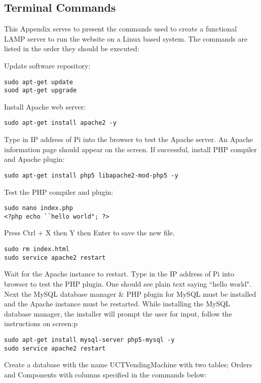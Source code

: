 \documentclass[a4paper,11pt]{article}
\numberwithin{figure}{section}
\numberwithin{table}{section}
\begin{document}
\begin{appendices}
\newpage


\section{Terminal Commands}\thispagestyle{sectionstart}
\label{sec:PiCommands}

This Appendix serves to present the commands used to create a functional LAMP server to run the website on a Linux based system. The commands are listed in the order they should be executed:

Update software repository:
\begin{lstlisting}
sudo apt-get update
suod apt-get upgrade
\end{lstlisting}
Install Apache web server:
\begin{lstlisting}[firstnumber=3]
sudo apt-get install apache2 -y
\end{lstlisting}
Type in IP address of Pi into the browser to test the Apache server. An Apache information page should appear on the screen. If successful, install PHP compiler and Apache plugin:
\begin{lstlisting}[firstnumber=4]
sudo apt-get install php5 libapache2-mod-php5 -y
\end{lstlisting}
Test the PHP compiler and plugin:
\begin{lstlisting}[firstnumber=5]
sudo nano index.php
<?php echo ``hello world"; ?>
\end{lstlisting}
Press Ctrl + X then Y then Enter to save the new file.
\begin{lstlisting}[firstnumber=7]
sudo rm index.html
sudo service apache2 restart
\end{lstlisting}
Wait for the Apache instance to restart. Type in the IP address of Pi into browser to test the PHP plugin. One should see plain text saying ``hello world". Next the MySQL database manager \& PHP plugin for MySQL must be installed and the Apache instance must be restarted. While installing the MySQL database manager, the installer will prompt the user for input, follow the instructions on screen:p
\begin{lstlisting}[firstnumber=9]
sudo apt-get install mysql-server php5-mysql -y
sudo service apache2 restart
\end{lstlisting}
Create a database with the name UCTVendingMachine with two tables; Orders and Components with columns specified in the commands below:

\end{appendices}
\end{document}
